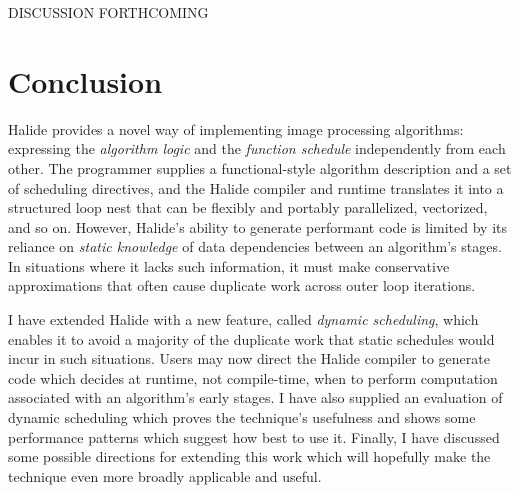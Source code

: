 \documentclass{article}
\begin{document}

DISCUSSION FORTHCOMING


\section{Conclusion}

Halide provides a novel way of implementing image processing algorithms: expressing the {\em algorithm logic} and the {\em function schedule} independently from each other. The programmer supplies a functional-style algorithm description and a set of scheduling directives, and the Halide compiler and runtime translates it into a structured loop nest that can be flexibly and portably parallelized, vectorized, and so on.
However, Halide's ability to generate performant code is limited by its reliance on {\em static knowledge} of data dependencies between an algorithm's stages. In situations where it lacks such information, it must make conservative approximations that often cause duplicate work across outer loop iterations.

I have extended Halide with a new feature, called {\em dynamic scheduling}, which enables it to avoid a majority of the duplicate work that static schedules would incur in such situations. Users may now direct the Halide compiler to generate code which decides at runtime, not compile-time, when to perform computation associated with an algorithm's early stages. I have also supplied an evaluation of dynamic scheduling which proves the technique's usefulness and shows some performance patterns which suggest how best to use it. Finally, I have discussed some possible directions for extending this work which will hopefully make the technique even more broadly applicable and useful.
\end{document}
